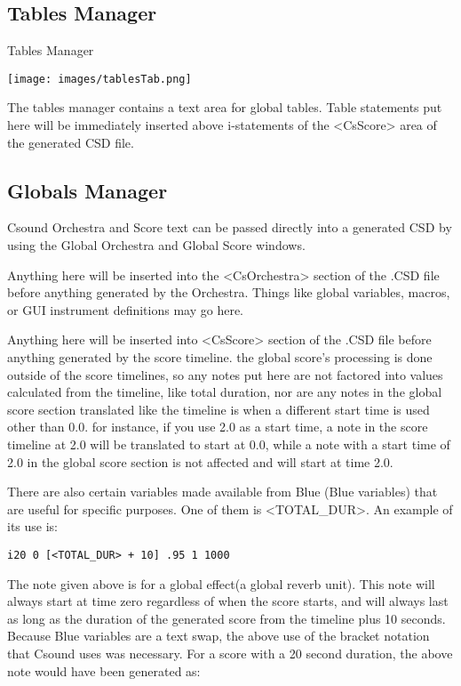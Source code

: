 \subsection{Tables Manager}\label{tablesManager}

Tables Manager

\texttt{[image: images/tablesTab.png]}

The tables manager contains a text area for global tables. Table
statements put here will be immediately inserted above i-statements of
the \textless{}CsScore\textgreater{} area of the generated CSD file.

\subsection{Globals Manager}\label{globalsManager}

Csound Orchestra and Score text can be passed directly into a generated
CSD by using the Global Orchestra and Global Score windows.

Anything here will be inserted into the
\textless{}CsOrchestra\textgreater{} section of the .CSD file before
anything generated by the Orchestra. Things like global variables,
macros, or GUI instrument definitions may go here.

Anything here will be inserted into \textless{}CsScore\textgreater{}
section of the .CSD file before anything generated by the score
timeline. the global score's processing is done outside of the score
timelines, so any notes put here are not factored into values calculated
from the timeline, like total duration, nor are any notes in the global
score section translated like the timeline is when a different start
time is used other than 0.0. for instance, if you use 2.0 as a start
time, a note in the score timeline at 2.0 will be translated to start at
0.0, while a note with a start time of 2.0 in the global score section
is not affected and will start at time 2.0.

There are also certain variables made available from Blue (Blue
variables) that are useful for specific purposes. One of them is
\textless{}TOTAL\_DUR\textgreater{}. An example of its use is:

\begin{verbatim}
i20 0 [<TOTAL_DUR> + 10] .95 1 1000
\end{verbatim}

The note given above is for a global effect(a global reverb unit). This
note will always start at time zero regardless of when the score starts,
and will always last as long as the duration of the generated score from
the timeline plus 10 seconds. Because Blue variables are a text swap,
the above use of the bracket notation that Csound uses was necessary.
For a score with a 20 second duration, the above note would have been
generated as:

